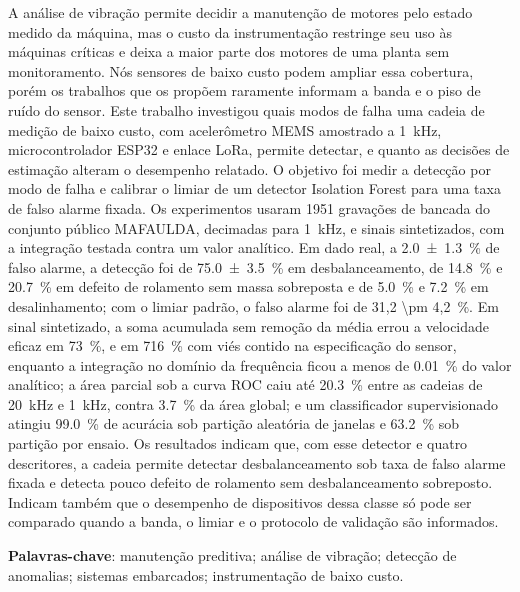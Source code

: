 
\begin{resumo}
A análise de vibração permite decidir a manutenção de motores pelo estado medido da máquina,
mas o custo da instrumentação restringe seu uso às máquinas críticas e deixa a maior parte
dos motores de uma planta sem monitoramento. Nós sensores de baixo custo podem ampliar essa
cobertura, porém os trabalhos que os propõem raramente informam a banda e o piso de ruído do
sensor. Este trabalho investigou quais modos de falha uma cadeia de medição de baixo custo, com
acelerômetro MEMS amostrado a \SI{1}{\kilo\hertz}, microcontrolador ESP32 e enlace LoRa, permite
detectar, e quanto as decisões de estimação alteram o desempenho relatado. O objetivo foi medir a
detecção por modo de falha e calibrar o limiar de um detector Isolation Forest para uma taxa de
falso alarme fixada. Os experimentos usaram \num{1951} gravações de bancada do conjunto público
MAFAULDA, decimadas para \SI{1}{\kilo\hertz}, e sinais sintetizados, com a integração testada
contra um valor analítico. Em dado real, a \SI{2,0 \pm 1,3}{\percent} de falso alarme, a detecção
foi de \SI{75,0 \pm 3,5}{\percent} em desbalanceamento, de \SI{14,8}{\percent} e
\SI{20,7}{\percent} em defeito de rolamento sem massa sobreposta e de \SI{5,0}{\percent} e
\SI{7,2}{\percent} em desalinhamento; com o limiar padrão, o falso alarme foi de \SI{31,2 \pm
4,2}{\percent}. Em sinal sintetizado, a soma acumulada sem remoção da média errou a velocidade
eficaz em \SI{73}{\percent}, e em \SI{716}{\percent} com viés contido na especificação do sensor,
enquanto a integração no domínio da frequência ficou a menos de \SI{0,01}{\percent} do valor
analítico; a área parcial sob a curva ROC caiu até \SI{20,3}{\percent} entre as cadeias de
\SI{20}{\kilo\hertz} e \SI{1}{\kilo\hertz}, contra \SI{3,7}{\percent} da área global; e um
classificador supervisionado atingiu \SI{99,0}{\percent} de acurácia sob partição aleatória de
janelas e \SI{63,2}{\percent} sob partição por ensaio.  Os resultados indicam que, com esse detector e quatro
descritores, a cadeia permite detectar desbalanceamento sob taxa de falso alarme fixada e detecta
pouco defeito de rolamento sem desbalanceamento sobreposto. Indicam também que o desempenho de
dispositivos dessa classe só pode ser comparado quando a banda, o limiar e o protocolo de validação
são informados.

\vspace{\onelineskip}
\noindent
\textbf{Palavras-chave}: manutenção preditiva; análise de vibração; detecção de anomalias;
sistemas embarcados; instrumentação de baixo custo.
\end{resumo}
